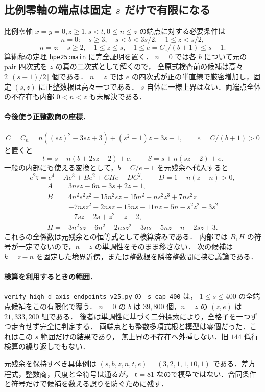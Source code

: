 \subsection{比例零軸の端点は固定 \texorpdfstring{$s$}{s} だけで有限になる}
\label{nhpe25:section}
比例零軸 $x=y=0,z\ge1,s<t,0\le n\le z$ の端点に対する必要条件は
\[
 n=0:\quad s\ge3,\quad s<b<3s/2,\quad 1\le z<s/2,
\]
\[
 n=z:\quad s\ge2,\quad 1\le z\le s,\quad
 1\le e=C_z/(b+1)\le s-1.
\]
算術稿の定理 \texttt{hpe25:main} に完全証明を置く．
$n=0$ では各 $b$ について元の pair 四次式を $z$ の真の二次式として解くので，
全原式検査前の候補は高々 $2\lfloor(s-1)/2\rfloor$ 個である．
$n=z$ では $e$ の四次式が正の半直線で厳密増加し，固定 $(s,z)$ に正整数根は高々一つである．
$s$ 自体に一様上界はない．両端点全体の不存在も内部 $0<n<z$ も未解決である．

\paragraph{今後使う正整数商の座標．}
\[
 C=C_n=n((sz)^2-3sz+3)+(s^2-1)z-3s+1,\qquad e=C/(b+1)>0
\]
と置くと
\[
 t=s+n(b+2sz-2)+e,\qquad S=s+n(sz-2)+e.
\]
一般の内部にも使える変換として，$b=C/e-1$ を元残余へ代入すると
\[
 e^2\mathfrak r=e^4+A e^3+B e^2+CH e-DC^2,
 \qquad D=1+n(z-n)>0,
\]
\begin{align*}
 A={}&3nsz-6n+3s+2z-1,\\
 B={}&4n^2s^2z^2-15n^2sz+15n^2-ns^2z^3+7ns^2z\\
 &+7nsz^2-2nsz-15ns-11nz+5n-s^2z^2+3s^2\\
 &+7sz-2s+z^2-z-2,\\
 H={}&3n^2sz-6n^2-2nsz^2+3ns+5nz-n-2sz+3.
\end{align*}
これらの全係数は元残余との恒等式として検算済みである．
内部では $B,H$ の符号が一定でないので，$n=z$ の単調性をそのまま移さない．
次の候補は $k=z-n$ を固定した境界近傍，または整数根を隣接整数間に挟む議論である．

\paragraph{検算を利用するときの範囲．}
\nolinkurl{verify_high_d_axis_endpoints_v25.py} の \texttt{--s-cap 400} は，
$1\le s\le400$ の全端点候補をこの有限化で覆う．
$n=0$ の $b$ は $39{,}800$ 個，$n=z$ の $(z,e)$ は $21{,}333{,}200$ 組である．
後者は単調性に基づく二分探索により，全格子を一つずつ走査せず完全に判定する．
両端点とも整数多項式根と模型は零個だった．これはこの $s$ 範囲だけの結果であり，
無上界の不存在へ外挿しない．旧 $144$ 低行検算の繰り返しでもない．

元残余を保持すべき具体例は
$(s,b,z,n,t,e)=(3,2,1,1,10,1)$ である．差方程式，整数商，尺度と全符号は通るが，
$\mathfrak r=81$ なので模型ではない．合同条件と符号だけで候補を数える誤りを防ぐために残す．
